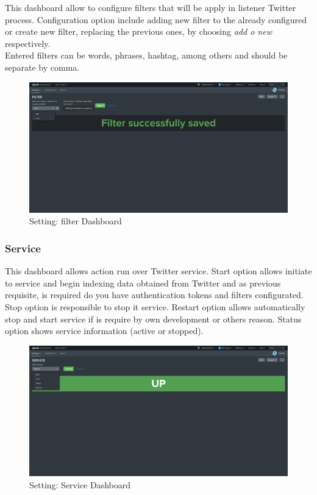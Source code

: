 \documentclass[report]{article}
\begin{document}
This dashboard allow to configure filters that will be apply in listener Twitter process. Configuration option include adding new filter to the already configured or create new filter, replacing the previous ones, by choosing \textit{add o new} respectively. \\Entered filters can be words, phrases, hashtag, among others and should be separate by comma.
\newline
\begin{figure}[h!]
	\centering
	\includegraphics[scale=0.2]{img/filter.png}
	\caption{\color{text}Setting: filter Dashboard}
\end{figure}

\subsubsection{Service}

This dashboard allows action run over Twitter service. Start option allows initiate to service and begin indexing data obtained from Twitter and as previous requisite, is required do you have authentication tokens and filters configurated. Stop option is responsible to stop it service. Restart option allows automatically stop and start service if is require by own development or others reason. Status option shows service information (active or stopped).
\newline
\begin{figure}[h!]
	\centering
	\includegraphics[scale=0.2]{img/service.png}
	\caption{\color{text}Setting: Service Dashboard}
\end{figure}
\end{document}
